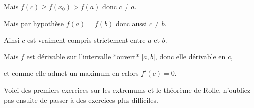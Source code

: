 \change

Mais $f(c) \ge f(x_0) > f(a)$ donc $c \neq a$. 

\change

Mais par hypothèse $f(a)=f(b)$ donc aussi $c\neq b$.

\change

Ainsi $c$ est vraiment compris strictement entre $a$ et $b$.

\change

Mais $f$ est dérivable sur l'intervalle *ouvert* $]a,b[$, donc elle dérivable en $c$, 

et comme elle admet un maximum en $c$alors $f'(c)=0$.


\diapo

Voici des premiers exercices sur les extremums et le théorème de Rolle,
n'oubliez pas ensuite de passer à des exercices plus difficiles.



